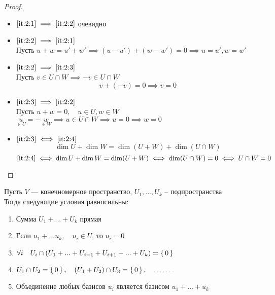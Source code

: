 \begin{proof}
	\hfill
    \begin{itemize}
        \item $ \ref{it:2:1} \implies \ref{it:2:2} $ очевидно
        \item $ \ref{it:2:2} \implies \ref{it:2:1} $ \\
        Пусть $ u + w = u' + w' \implies (u - u') + (w - w') = 0 \implies u = u', w = w' $
        \item $ \ref{it:2:2} \implies \ref{it:2:3} $ \\
        Пусть $ v \in U \cap W \implies -v \in U \cap W $
        $$ v + (-v) = 0 \implies v = 0 $$
        \item $ \ref{it:2:3} \implies \ref{it:2:2} $ \\
        Пусть $ u + w = 0, \quad u \in U, w \in W $ \\
        $ \underset{\in U}u = -\underset{\in W}w \implies u \in U \cap W \implies u = 0 \implies w = 0 $
        \item $ \ref{it:2:3} \iff \ref{it:2:4} $
        $$ \dim U + \dim W = \dim (U + W) + \dim (U \cap W) $$
        $$ \ref{it:2:4} \iff \dim U + \dim W = \dim (U + W) \iff \dim (U \cap W) = 0 \iff U \cap W = 0 $$
    \end{itemize}
\end{proof}

\begin{theorem}
	Пусть $V$ --- конечномерное пространство, $U_1, ..., U_k $ -- подпространства \\
    Тогда следующие условия равносильны:
    \begin{enumerate}
        \item \label{it:3:1} Сумма $ U_1 + ... + U_k $ прямая
        \item \label{it:3:2} Если $ u_1 + ... u_k, \quad u_i \in U $, то $u_i = 0 $
        \item \label{it:3:3} $ \forall i \quad U_i \cap (U_1 + ... + U_{i - 1} + U_{i + 1} + ... + U_k) = \set{0} $
        \item \label{it:3:4} $ U_1 \cap U_2 = \set{0}, \quad (U_1 + U_2) \cap U_3 = \set{0}, \quad \widedots[3em] $
        \item \label{it:3:5} Объединение любых базисов $u_i$ является базисом $u_1 + ... + u_k $
    \end{enumerate}
\end{theorem}

